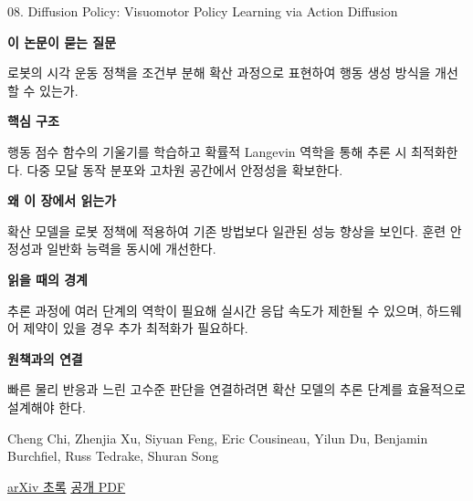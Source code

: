 \documentclass[11pt,openany]{book}
\begin{document}
\begin{termcard}{08. Diffusion Policy: Visuomotor Policy Learning via Action Diffusion}

\par

\medskip

{\sffamily\bfseries\color{deepblue} 이 논문이 묻는 질문}\par

로봇의 시각 운동 정책을 조건부 분해 확산 과정으로 표현하여 행동 생성 방식을 개선할 수 있는가.

\smallskip

{\sffamily\bfseries\color{deepblue} 핵심 구조}\par

행동 점수 함수의 기울기를 학습하고 확률적 Langevin 역학을 통해 추론 시 최적화한다. 다중 모달 동작 분포와 고차원 공간에서 안정성을 확보한다.

\smallskip

{\sffamily\bfseries\color{deepblue} 왜 이 장에서 읽는가}\par

확산 모델을 로봇 정책에 적용하여 기존 방법보다 일관된 성능 향상을 보인다. 훈련 안정성과 일반화 능력을 동시에 개선한다.

\smallskip

{\sffamily\bfseries\color{coral} 읽을 때의 경계}\par

추론 과정에 여러 단계의 역학이 필요해 실시간 응답 속도가 제한될 수 있으며, 하드웨어 제약이 있을 경우 추가 최적화가 필요하다.

\smallskip

{\sffamily\bfseries\color{teal} 원책과의 연결}\par

빠른 물리 반응과 느린 고수준 판단을 연결하려면 확산 모델의 추론 단계를 효율적으로 설계해야 한다.

\medskip

{\footnotesize\color{muted} Cheng Chi, Zhenjia Xu, Siyuan Feng, Eric Cousineau, Yilun Du, Benjamin Burchfiel, Russ Tedrake, Shuran Song\par

\href{https://arxiv.org/abs/2303.04137}{arXiv 초록} \quad \href{https://arxiv.org/pdf/2303.04137}{공개 PDF}\par}

\end{termcard}
\end{document}

